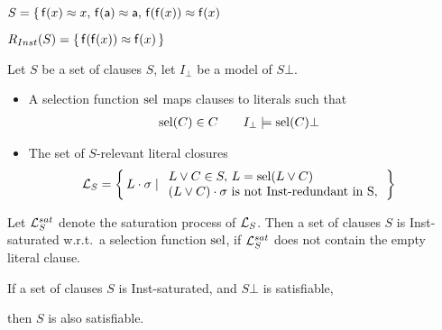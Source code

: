 \begin{example}
   \( S =
       \{ \,
       \mathsf{f}(x)\approx x,\,
       \mathsf{f}(\mathsf{a})\approx \mathsf{a},\,
       \mathsf{f}(\mathsf{f}(x))\approx\mathsf{f}(x)
       \,  \)

   \( R_{Inst}(S) = \{ \, \mathsf{f}(\mathsf{f}(x))\approx\mathsf{f}(x) \, \} \)
   \end{example}

   \begin{definition}[S-Relevance]
        Let \( S \) be a set of clauses \( S \), let \( I_\bot \) be a model of \( S\bot \).

       \begin{itemize}
           \item
        A selection function \( \operatorname{sel} \) maps clauses to literals such that
       \begin{align*}
           \operatorname{sel}(C)&\in C
            &&&
            I_\bot&\models\operatorname{sel}(C)\bot
       \end{align*}

       \item
        The set of \( S \)-relevant literal closures
       \begin{align*}
           \mathcal{L}_S &= \left \{ \, L\cdot\sigma \mid
           \begin{array}{l}
                L\lor C\in S,\,L = \operatorname{sel}(L\lor C)\\
                (L\lor C)\cdot\sigma\text{ is not Inst-redundant in S},\\
           \end{array}
           \, \right \}
       \end{align*}




   \end{itemize}
\end{definition}

\begin{definition}
    Let \( \mathcal{L}_S^{sat} \) denote the saturation process of \( \mathcal{L}_S \).
    Then a set of clauses \( S \) is Inst-saturated w.r.t.~a selection function \( \operatorname{sel} \),
            if \( \mathcal{L}_S^{sat} \) does not contain the empty literal clause.
\end{definition}
       \begin{theorem}
        If a set of clauses \( S \) is Inst-saturated,
        and \( S\bot \) is satisfiable,

        then \( S \) is also satisfiable.
       \end{theorem}

